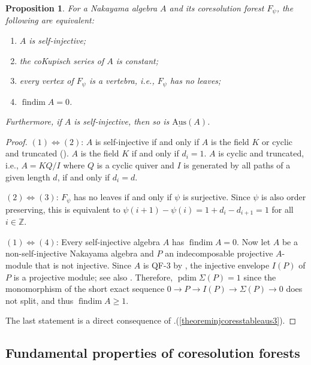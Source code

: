 \documentclass[a4paper]{amsart}
\newtheorem{proposition}[theorem]{Proposition}
\theoremstyle{definition}
\theoremstyle{remark}
\numberwithin{equation}{theorem}
\newcommand{\findim}{\operatorname{findim}}
\newcommand{\sAus}{\operatorname{\underline{Aus}}}
\newcommand{\Z}{\mathbb{Z}}
\newcommand{\pdim}{\operatorname{pdim}}
\newcommand{\psiforest}{F_\psi}
\newcommand{\K}{K}
\begin{document}
\begin{proposition}\label{prop:self_injective}
  For a Nakayama algebra $ A $ and its coresolution forest $ \psiforest $, the following are equivalent:
    \begin{enumerate}
        \item\label{self-inj} $A$ is self-injective;
        \item the coKupisch series of $ A $ is constant;
        \item\label{only.vertebra}
        every vertex of $ \psiforest $ is a vertebra, i.e., $\psiforest$ has no leaves;
        \item $ \findim A = 0 $.
    \end{enumerate}
    Furthermore, if $ A $ is self-injective, then so is $ \sAus(A) $.
\end{proposition}

\begin{proof}
    $ (1) \Leftrightarrow (2) $: $ A $ is self-injective if and only if $ A $ is the field $ \K $ or cyclic and truncated (\cite[Proposition V.3.8]{ASS}).  $ A $ is the field $ \K $ if and only if $ d_i = 1 $.  $ A $ is cyclic and truncated, i.e., $ A = \K Q / I $ where $ Q $ is a cyclic quiver and $ I $ is generated by all paths of a given length $ d $, if and only if $ d_i = d $.

    $ (2) \Leftrightarrow (3) $: $\psiforest$ has no leaves if and only if $ \psi $ is surjective. Since $ \psi $ is also order preserving, this is equivalent to $\psi(i+1) - \psi(i) = 1 + d_i - d_{i+1} = 1$ for all $i \in \Z $.

    $ (1) \Leftrightarrow (4) $: Every self-injective algebra $ A $ has $ \findim A = 0 $. Now let $A$ be a non-self-injective Nakayama algebra and $P$ an indecomposable projective $A$-module that is not injective. Since $ A $ is QF-3 by \cite[Theorem~32.2]{AF}, the injective envelope $ I(P) $ of $ P $ is a projective module; see also \cite[Theorem~31.6]{AF}.
    Therefore, $ \pdim \Sigma (P) = 1 $ since the monomorphism of the short exact sequence $ 0 \to P \to I(P) \to \Sigma(P) \to 0 $ does not split, and thus $ \findim A \geq 1 $.

    The last statement is a direct consequence of .(\ref{theoreminjcoresstableaus3}).
\end{proof}


\subsection{Fundamental properties of coresolution forests}\label{fundamental.properties}
\end{document}
